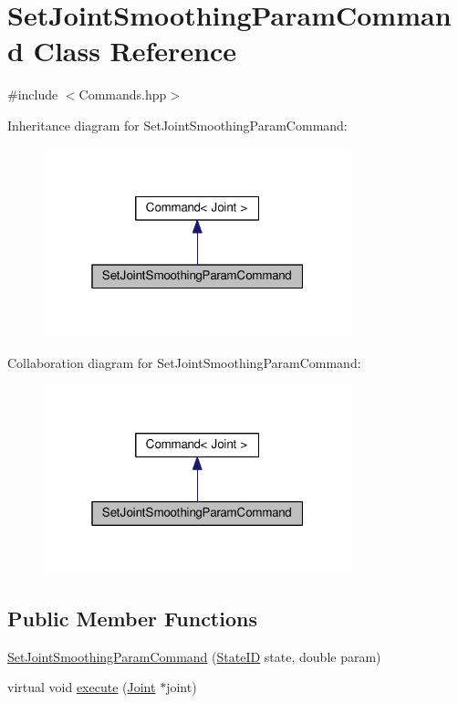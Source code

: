 \hypertarget{classSetJointSmoothingParamCommand}{}\section{Set\+Joint\+Smoothing\+Param\+Command Class Reference}
\label{classSetJointSmoothingParamCommand}


{\ttfamily \#include $<$Commands.\+hpp$>$}



Inheritance diagram for Set\+Joint\+Smoothing\+Param\+Command\+:\nopagebreak
\begin{figure}[H]
\begin{center}
\leavevmode
\includegraphics[width=253pt]{classSetJointSmoothingParamCommand__inherit__graph}
\end{center}
\end{figure}


Collaboration diagram for Set\+Joint\+Smoothing\+Param\+Command\+:\nopagebreak
\begin{figure}[H]
\begin{center}
\leavevmode
\includegraphics[width=253pt]{classSetJointSmoothingParamCommand__coll__graph}
\end{center}
\end{figure}
\subsection*{Public Member Functions}
\begin{DoxyCompactItemize}
\item 
\hyperlink{classSetJointSmoothingParamCommand_ac8bf51b6a2e8507adf8e4b0687eb21c4}{Set\+Joint\+Smoothing\+Param\+Command} (\hyperlink{States_8hpp_a26aafbeccd8f356b39e1809f1ab9cfdc}{State\+ID} state, double param)
\item 
virtual void \hyperlink{classSetJointSmoothingParamCommand_a1ea658af81e810b3f5344816705a3c56}{execute} (\hyperlink{classJoint}{Joint} $\ast$joint)
\end{DoxyCompactItemize}


